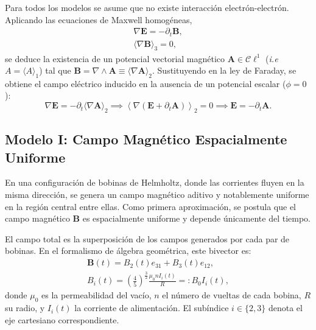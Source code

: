 Para todos los modelos se asume que no existe interacción
electrón-electrón. Aplicando las ecuaciones de Maxwell homogéneas,
%
\begin{gather}
	\label{eq:faraday-gauss}
	\nabla \boldsymbol{E} = -\partial_t \boldsymbol{B},
	\\
	\label{eq:no-monopoles}
	\langle \nabla \boldsymbol{B} \rangle_{3} = 0,
\end{gather}
%
se deduce la existencia de un potencial vectorial magnético
$\boldsymbol{A} \in \mathcal{C}\ell^1$ (\emph{i.e} $A = \langle A \rangle_{1}$)
tal que $\boldsymbol{B} = \nabla \wedge \boldsymbol{A} \equiv \langle\nabla
\boldsymbol{A}\rangle_{2}$.
Sustituyendo en la ley de Faraday, se obtiene el campo eléctrico inducido
en la ausencia de un potencial escalar ($\phi=0$):
%
\begin{equation}
	\nabla \boldsymbol{E} = -\partial_t \langle\nabla \boldsymbol{A}\rangle_{2}
	\implies
	\left\langle \nabla (\boldsymbol{E} + \partial_t \boldsymbol{A})
	\right\rangle_{2} = 0
	\implies
	\boldsymbol{E} = - \partial_t \boldsymbol{A}.
	\label{eq:induced-E}
\end{equation}

\subsection{Modelo I: Campo Magnético Espacialmente Uniforme}
\label{ssec:campo_uniforme}

En una configuración de bobinas de Helmholtz, donde las corrientes fluyen
en la misma dirección, se genera un campo magnético aditivo y
notablemente uniforme en la región central entre ellas. Como primera
aproximación, se postula que el campo magnético $\boldsymbol{B}$ es
espacialmente uniforme y depende únicamente del tiempo.

El campo total es la superposición de los campos generados por cada par
de bobinas. En el formalismo de álgebra geométrica, este bivector es:
\begin{gather}
	\boldsymbol{B}(t) = B_2(t) e_{31} + B_3(t) e_{12},
	\label{eq:B_field_uniform}
	\\
	B_i(t) = \left( \frac{4}{5} \right)^{\frac{3}{2}}
	\frac{\mu_0 n I_{i}(t)}{R} =: B_0 I_i(t),
	\label{eq:B_field_magnitude}
\end{gather}
%
donde $\mu_0$ es la permeabilidad del vacío, $n$ el número de vueltas de
cada bobina, $R$ su radio, y $I_i(t)$ la corriente de alimentación. El
subíndice $i \in \{2, 3\}$ denota el eje cartesiano correspondiente.

